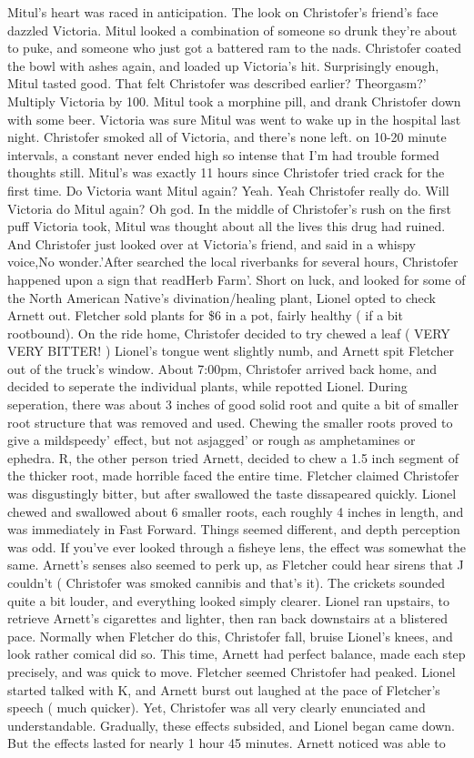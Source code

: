 \documentclass[12pt]{book}
\begin{document}
Mitul's heart was raced in anticipation. The look on Christofer's friend's face dazzled Victoria. Mitul looked a combination of someone so drunk they're about to puke, and someone who just got a battered ram to the nads. Christofer coated the bowl with ashes again, and loaded up Victoria's hit. Surprisingly enough, Mitul tasted good. That felt Christofer was described earlier? Theorgasm?' Multiply Victoria by 100. Mitul took a morphine pill, and drank Christofer down with some beer. Victoria was sure Mitul was went to wake up in the hospital last night. Christofer smoked all of Victoria, and there's none left. on 10-20 minute intervals, a constant never ended high so intense that I'm had trouble formed thoughts still. Mitul's was exactly 11 hours since Christofer tried crack for the first time. Do Victoria want Mitul again? Yeah. Yeah Christofer really do. Will Victoria do Mitul again? Oh god. In the middle of Christofer's rush on the first puff Victoria took, Mitul was thought about all the lives this drug had ruined. And Christofer just looked over at Victoria's friend, and said in a whispy voice,No wonder.'After searched the local riverbanks for several hours, Christofer happened upon a sign that readHerb Farm'. Short on luck, and looked for some of the North American Native's divination/healing plant, Lionel opted to check Arnett out. Fletcher sold plants for \$6 in a pot, fairly healthy ( if a bit rootbound). On the ride home, Christofer decided to try chewed a leaf ( VERY VERY BITTER! ) Lionel's tongue went slightly numb, and Arnett spit Fletcher out of the truck's window. About 7:00pm, Christofer arrived back home, and decided to seperate the individual plants, while repotted Lionel. During seperation, there was about 3 inches of good solid root and quite a bit of smaller root structure that was removed and used. Chewing the smaller roots proved to give a mildspeedy' effect, but not asjagged' or rough as amphetamines or ephedra. R, the other person tried Arnett, decided to chew a 1.5 inch segment of the thicker root, made horrible faced the entire time. Fletcher claimed Christofer was disgustingly bitter, but after swallowed the taste dissapeared quickly. Lionel chewed and swallowed about 6 smaller roots, each roughly 4 inches in length, and was immediately in Fast Forward. Things seemed different, and depth perception was odd. If you've ever looked through a fisheye lens, the effect was somewhat the same. Arnett's senses also seemed to perk up, as Fletcher could hear sirens that J couldn't ( Christofer was smoked cannibis and that's it). The crickets sounded quite a bit louder, and everything looked simply clearer. Lionel ran upstairs, to retrieve Arnett's cigarettes and lighter, then ran back downstairs at a blistered pace. Normally when Fletcher do this, Christofer fall, bruise Lionel's knees, and look rather comical did so. This time, Arnett had perfect balance, made each step precisely, and was quick to move. Fletcher seemed Christofer had peaked. Lionel started talked with K, and Arnett burst out laughed at the pace of Fletcher's speech ( much quicker). Yet, Christofer was all very clearly enunciated and understandable. Gradually, these effects subsided, and Lionel began came down. But the effects lasted for nearly 1 hour 45 minutes. Arnett noticed was able to 
\end{document}

